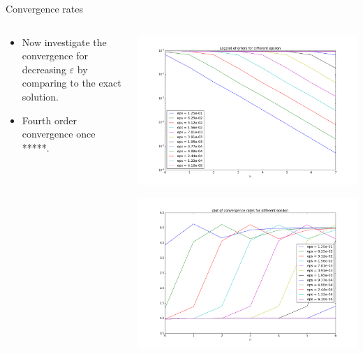 \documentclass{beamer}
\renewcommand{\epsilon}{\varepsilon}
\begin{document}
\begin{frame}[t]{Convergence rates}
\begin{columns}
    \begin{column}[c]{.5\textwidth}
      \begin{itemize}
      \item Now investigate the convergence for decreasing $\epsilon$ by comparing to the exact solution.
      \item Fourth order convergence once *****.
    \end{itemize}
  \end{column}
  \begin{column}[c]{.5\textwidth}

    \includegraphics[width=0.85\linewidth]{one_dim_h_eps1.png}
    
    \includegraphics[width=0.85\linewidth]{one_dim_h_eps2.png}
 \end{column}
\end{columns}  
\end{frame}
\end{document}
